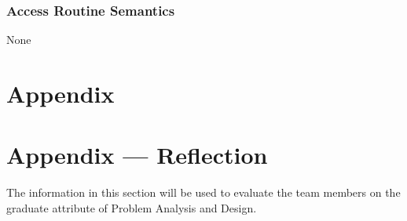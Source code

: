 \documentclass[12pt, titlepage]{article}
\begin{document}
\subsubsection{Access Routine Semantics}

None

\newpage

\section{Appendix} \label{Appendix}


\newpage{}

\section*{Appendix --- Reflection}


The information in this section will be used to evaluate the team members on the
graduate attribute of Problem Analysis and Design.


\end{document}
